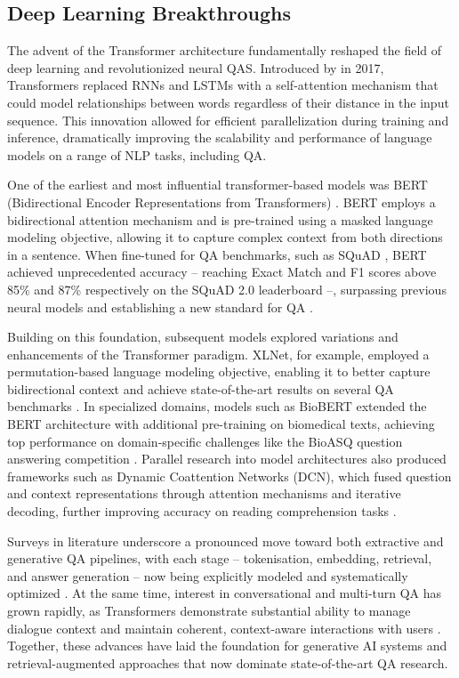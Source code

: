 \begin{spacing}{1.5}
\section{Deep Learning Breakthroughs}
The advent of the Transformer architecture fundamentally reshaped the field of deep learning and revolutionized neural QAS. Introduced by \citeauthor{vaswani_attention_2017} in 2017, Transformers replaced RNNs and LSTMs with a self-attention mechanism that could model relationships between words regardless of their distance in the input sequence. This innovation allowed for efficient parallelization during training and inference, dramatically improving the scalability and performance of language models on a range of NLP tasks, including QA.

One of the earliest and most influential transformer-based models was BERT (Bidirectional Encoder Representations from Transformers) \citep{devlin_bert_2019}. BERT employs a bidirectional attention mechanism and is pre-trained using a masked language modeling objective, allowing it to capture complex context from both directions in a sentence. When fine-tuned for QA benchmarks, such as SQuAD \citep{rajpurkar_squad_2016}, BERT achieved unprecedented accuracy -- reaching Exact Match and F1 scores above 85\% and 87\% respectively on the SQuAD 2.0 leaderboard --, surpassing previous neural models and establishing a new standard for QA \citep{li_death_2024}.

Building on this foundation, subsequent models explored variations and enhancements of the Transformer paradigm. XLNet, for example, employed a permutation-based language modeling objective, enabling it to better capture bidirectional context and achieve state-of-the-art results on several QA benchmarks \citep{yang_xlnet_2020}. In specialized domains, models such as BioBERT extended the BERT architecture with additional pre-training on biomedical texts, achieving top performance on domain-specific challenges like the BioASQ question answering competition \citep{yoon_pre-trained_2019}. Parallel research into model architectures also produced frameworks such as Dynamic Coattention Networks (DCN), which fused question and context representations through attention mechanisms and iterative decoding, further improving accuracy on reading comprehension tasks \citep{xiong_dynamic_2018}.

Surveys in literature underscore a pronounced move toward both extractive and generative QA pipelines, with each stage -- tokenisation, embedding, retrieval, and answer generation -- now being explicitly modeled and systematically optimized \citep{farea_understanding_2025}. At the same time, interest in conversational and multi-turn QA has grown rapidly, as Transformers demonstrate substantial ability to manage dialogue context and maintain coherent, context-aware interactions with users \citep{yue_survey_2025,antoniou_survey_2022}. Together, these advances have laid the foundation for generative AI systems and retrieval-augmented approaches that now dominate state-of-the-art QA research.


\end{spacing}
